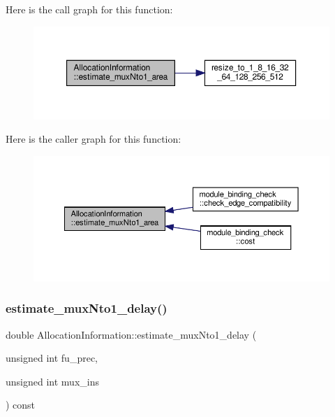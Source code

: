 Here is the call graph for this function\+:
\nopagebreak
\begin{figure}[H]
\begin{center}
\leavevmode
\includegraphics[width=350pt]{d7/d79/classAllocationInformation_aff550cbb8329a2ce4a4fad783ff06544_cgraph}
\end{center}
\end{figure}
Here is the caller graph for this function\+:
\nopagebreak
\begin{figure}[H]
\begin{center}
\leavevmode
\includegraphics[width=350pt]{d7/d79/classAllocationInformation_aff550cbb8329a2ce4a4fad783ff06544_icgraph}
\end{center}
\end{figure}
\mbox{\label{classAllocationInformation_a395eb7ee43f8d119ec00f900af66b8cd}} 
\subsubsection{\texorpdfstring{estimate\+\_\+mux\+Nto1\+\_\+delay()}{estimate\_muxNto1\_delay()}}
{\footnotesize\ttfamily double Allocation\+Information\+::estimate\+\_\+mux\+Nto1\+\_\+delay (\begin{DoxyParamCaption}\item[{unsigned int}]{fu\+\_\+prec,  }\item[{unsigned int}]{mux\+\_\+ins }\end{DoxyParamCaption}) const}



